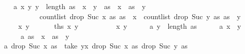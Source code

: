\begin{isabellebody}
\isanewline
\ \ \isamarkupfalse%
\ a{}{\isacharcolon}{\kern0pt}\ {\isachardoublequoteopen}{\isasymAnd}x\ y{\isachardot}{\kern0pt}\ y\ {\isacharless}{\kern0pt}\ length\ as\ {\isasymLongrightarrow}\ x\ {\isacharless}{\kern0pt}\ y\ {\isasymLongrightarrow}\ as\ {\isacharbang}{\kern0pt}\ x\ {\isacharequal}{\kern0pt}\ as\ {\isacharbang}{\kern0pt}\ y\ {\isasymLongrightarrow}\isanewline
\ \ \ \ \ \ \ \ \ \ \ count{\isacharunderscore}{\kern0pt}list\ {\isacharparenleft}{\kern0pt}drop\ {\isacharparenleft}{\kern0pt}Suc\ x{\isacharparenright}{\kern0pt}\ as{\isacharparenright}{\kern0pt}\ {\isacharparenleft}{\kern0pt}as\ {\isacharbang}{\kern0pt}\ x{\isacharparenright}{\kern0pt}\ {\isasymnoteq}\ count{\isacharunderscore}{\kern0pt}list\ {\isacharparenleft}{\kern0pt}drop\ {\isacharparenleft}{\kern0pt}Suc\ y{\isacharparenright}{\kern0pt}\ as{\isacharparenright}{\kern0pt}\ {\isacharparenleft}{\kern0pt}as\ {\isacharbang}{\kern0pt}\ y{\isacharparenright}{\kern0pt}{\isachardoublequoteclose}\ \isanewline
\ \ \ \ {\isacharparenleft}{\kern0pt}\ {\isachardoublequoteopen}{\isasymAnd}x\ y{\isachardot}{\kern0pt}\ {\isacharunderscore}{\kern0pt}\ {\isasymLongrightarrow}\ {\isacharunderscore}{\kern0pt}\ {\isasymLongrightarrow}\ {\isacharunderscore}{\kern0pt}\ {\isasymLongrightarrow}\ {\isacharquery}{\kern0pt}ths\ x\ y{\isachardoublequoteclose}{\isacharparenright}{\kern0pt}\isanewline
\ \ \isamarkupfalse%
\ {\isacharminus}{\kern0pt}\isanewline
\ \ \ \ \isamarkupfalse%
\ x\ y\isanewline
\ \ \ \ \isamarkupfalse%
\ a{}{\isacharunderscore}{\kern0pt}{}{\isacharcolon}{\kern0pt}\ {\isachardoublequoteopen}y\ {\isacharless}{\kern0pt}\ length\ as{\isachardoublequoteclose}\isanewline
\ \ \ \ \isamarkupfalse%
\ a{}{\isacharunderscore}{\kern0pt}{}{\isacharcolon}{\kern0pt}\ {\isachardoublequoteopen}x\ {\isacharless}{\kern0pt}\ y{\isachardoublequoteclose}\isanewline
\ \ \ \ \isamarkupfalse%
\ a{}{\isacharunderscore}{\kern0pt}{}{\isacharcolon}{\kern0pt}\ {\isachardoublequoteopen}as\ {\isacharbang}{\kern0pt}\ x\ {\isacharequal}{\kern0pt}\ as\ {\isacharbang}{\kern0pt}\ y{\isachardoublequoteclose}\isanewline
\ \ \ \ \isamarkupfalse%
\ a{}{\isacharunderscore}{\kern0pt}{}{\isacharcolon}{\kern0pt}\ {\isachardoublequoteopen}drop\ {\isacharparenleft}{\kern0pt}Suc\ x{\isacharparenright}{\kern0pt}\ as\ {\isacharequal}{\kern0pt}\ take\ {\isacharparenleft}{\kern0pt}y{\isacharminus}{\kern0pt}x{\isacharparenright}{\kern0pt}\ {\isacharparenleft}{\kern0pt}drop\ {\isacharparenleft}{\kern0pt}Suc\ x{\isacharparenright}{\kern0pt}\ as{\isacharparenright}{\kern0pt}{\isacharat}{\kern0pt}\ drop\ {\isacharparenleft}{\kern0pt}Suc\ y{\isacharparenright}{\kern0pt}\ as{\isachardoublequoteclose}\isanewline

\end{isabellebody}
